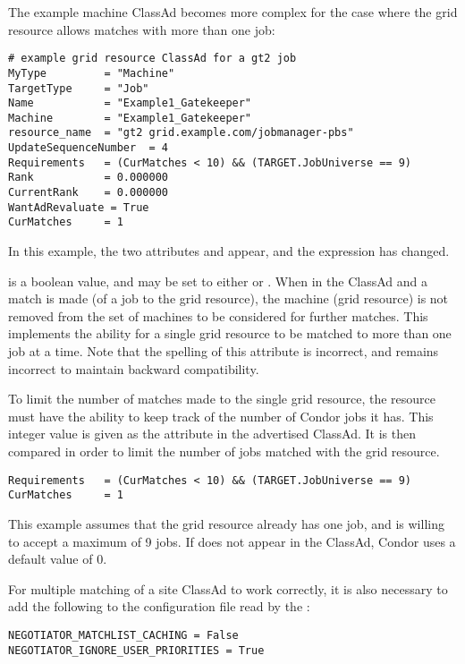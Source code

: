 The example machine ClassAd becomes more complex
for the case where the grid resource allows matches with more
than one job:
\footnotesize
\begin{verbatim}
# example grid resource ClassAd for a gt2 job
MyType         = "Machine"
TargetType     = "Job"
Name           = "Example1_Gatekeeper"
Machine        = "Example1_Gatekeeper"
resource_name  = "gt2 grid.example.com/jobmanager-pbs"
UpdateSequenceNumber  = 4
Requirements   = (CurMatches < 10) && (TARGET.JobUniverse == 9)
Rank           = 0.000000
CurrentRank    = 0.000000
WantAdRevaluate = True
CurMatches     = 1
\end{verbatim}
\normalsize

In this example, the two attributes 
and  appear, and the 
expression has changed.

 is a boolean value, and may be set to
either  or .
When  in the ClassAd and a match is made (of a job
to the grid resource), the machine (grid resource)
is not removed from the set of machines to be considered for
further matches.
This implements the ability for a single grid resource to
be matched to more than one job at a time.
Note that the spelling of this attribute is incorrect,
and remains incorrect to maintain backward compatibility.

To limit the number of matches made to the single grid resource,
the resource must have the ability to keep track of the number 
of Condor jobs it has.
This integer value is given as the  attribute
in the advertised ClassAd.
It is then compared in order to limit the number of jobs matched
with the grid resource.
\footnotesize
\begin{verbatim}
Requirements   = (CurMatches < 10) && (TARGET.JobUniverse == 9)
CurMatches     = 1
\end{verbatim}
\normalsize

This example assumes that the grid resource already has
one job, and is willing to accept a maximum of 9 jobs.
If  does not appear in the ClassAd,
Condor uses a default value of 0.

For multiple matching of a site ClassAd to work correctly,
it is also necessary to add the following to the configuration file
read by the :

\begin{verbatim}
NEGOTIATOR_MATCHLIST_CACHING = False
NEGOTIATOR_IGNORE_USER_PRIORITIES = True
\end{verbatim}

